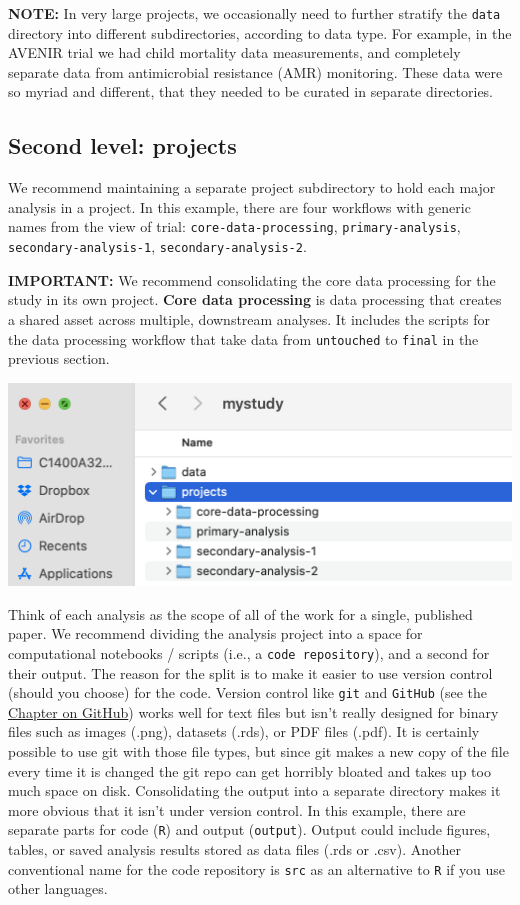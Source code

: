 \documentclass[
]{book}
\begin{document}
\textbf{NOTE:} In very large projects, we occasionally need to further stratify the \texttt{data} directory into different subdirectories, according to data type. For example, in the AVENIR trial we had child mortality data measurements, and completely separate data from antimicrobial resistance (AMR) monitoring. These data were so myriad and different, that they needed to be curated in separate directories.

\subsection{Second level: projects}\label{second-level-projects}

We recommend maintaining a separate project subdirectory to hold each major analysis in a project. In this example, there are four workflows with generic names from the view of trial: \texttt{core-data-processing}, \texttt{primary-analysis}, \texttt{secondary-analysis-1}, \texttt{secondary-analysis-2}.

\textbf{IMPORTANT:} We recommend consolidating the core data processing for the study in its own project. \textbf{Core data processing} is data processing that creates a shared asset across multiple, downstream analyses. It includes the scripts for the data processing workflow that take data from \texttt{untouched} to \texttt{final} in the previous section.

\includegraphics[width=0.75\linewidth]{images/mystudy-dir-fig3}

Think of each analysis as the scope of all of the work for a single, published paper. We recommend dividing the analysis project into a space for computational notebooks / scripts (i.e., a \texttt{code\ repository}), and a second for their output. The reason for the split is to make it easier to use version control (should you choose) for the code. Version control like \texttt{git} and \texttt{GitHub} (see the \hyperref[GitHub]{Chapter on GitHub}) works well for text files but isn't really designed for binary files such as images (.png), datasets (.rds), or PDF files (.pdf). It is certainly possible to use git with those file types, but since git makes a new copy of the file every time it is changed the git repo can get horribly bloated and takes up too much space on disk. Consolidating the output into a separate directory makes it more obvious that it isn't under version control. In this example, there are separate parts for code (\texttt{R}) and output (\texttt{output}). Output could include figures, tables, or saved analysis results stored as data files (.rds or .csv). Another conventional name for the code repository is \texttt{src} as an alternative to \texttt{R} if you use other languages.
\end{document}
